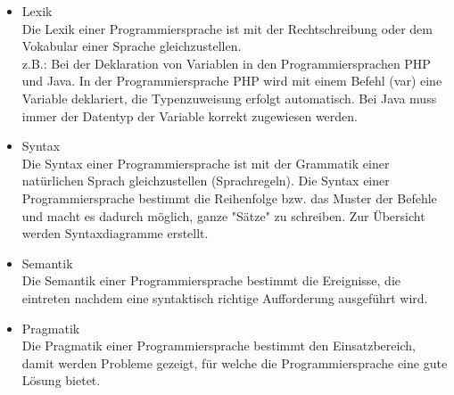 \documentclass[12pt,a4paper]{report}
\begin{document}
\begin{onehalfspace}
\begin{itemize}
\item Lexik\\
Die Lexik einer Programmiersprache ist mit der Rechtschreibung oder dem Vokabular einer Sprache gleichzustellen.\\
z.B.: Bei der Deklaration von Variablen in den Programmiersprachen PHP und Java. In der Programmiersprache PHP wird mit einem Befehl (var) eine Variable deklariert, die Typenzuweisung erfolgt automatisch. Bei Java muss immer der Datentyp der Variable korrekt zugewiesen werden.
\item Syntax\\
Die Syntax einer Programmiersprache ist mit der Grammatik einer natürlichen Sprach gleichzustellen (Sprachregeln).
Die Syntax einer Programmiersprache bestimmt die Reihenfolge bzw. das Muster der Befehle und macht es dadurch möglich, ganze "{}Sätze"{} zu schreiben. Zur Übersicht werden Syntaxdiagramme erstellt.
\item Semantik\\
Die Semantik einer Programmiersprache bestimmt die Ereignisse, die eintreten nachdem eine syntaktisch richtige Aufforderung ausgeführt wird.
\item Pragmatik\\
Die Pragmatik einer Programmiersprache bestimmt den Einsatzbereich, damit werden Probleme gezeigt, für welche die Programmiersprache eine gute Lösung bietet.
\end{itemize}



\end{onehalfspace}
\end{document}
